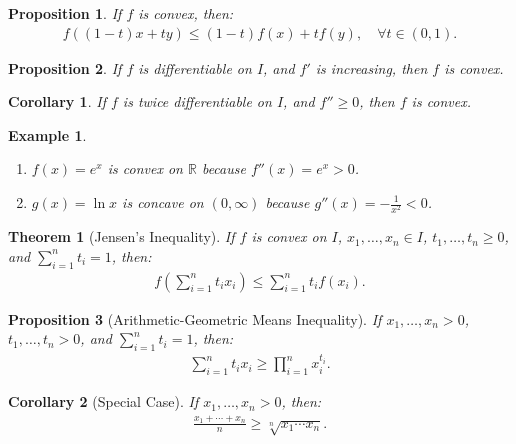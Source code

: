 \documentclass[7pt]{article}
\theoremstyle{definition}
\theoremstyle{plain}
\newtheorem{theorem}{Theorem}
\newtheorem{proposition}{Proposition}
\newtheorem{example}{Example}
\newtheorem{corollary}{Corollary}
\begin{document}
\begin{proposition}
If $ f $ is convex, then:
\begin{align}
f((1-t)x + ty) \leq (1-t)f(x) + tf(y), \quad \forall t \in (0, 1).
\end{align}
\end{proposition}

\begin{proposition}
If $ f $ is differentiable on $ I $, and $ f' $ is increasing, then $ f $ is convex.
\end{proposition}

\begin{corollary}
If $ f $ is twice differentiable on $ I $, and $ f'' \geq 0 $, then $ f $ is convex.
\end{corollary}

\begin{example}
\begin{enumerate}
    \item $ f(x) = e^x $ is convex on $ \mathbb{R} $ because $ f''(x) = e^x > 0 $.
    \item $ g(x) = \ln x $ is concave on $ (0, \infty) $ because $ g''(x) = -\frac{1}{x^2} < 0 $.
\end{enumerate}
\end{example}

\begin{theorem}[Jensen’s Inequality]
If $ f $ is convex on $ I $, $ x_1, \ldots, x_n \in I $, $ t_1, \ldots, t_n \geq 0 $, and $ \sum_{i=1}^n t_i = 1 $, then:
\begin{align}
f\left(\sum_{i=1}^n t_i x_i\right) \leq \sum_{i=1}^n t_i f(x_i).
\end{align}
\end{theorem}

\begin{proposition}[Arithmetic-Geometric Means Inequality]
If $ x_1, \ldots, x_n > 0 $, $ t_1, \ldots, t_n > 0 $, and $ \sum_{i=1}^n t_i = 1 $, then:
\begin{align}
\sum_{i=1}^n t_i x_i \geq \prod_{i=1}^n x_i^{t_i}.
\end{align}
\end{proposition}

\begin{corollary}[Special Case]
If $ x_1, \ldots, x_n > 0 $, then:
\begin{align}
\frac{x_1 + \cdots + x_n}{n} \geq \sqrt[n]{x_1 \cdots x_n}.
\end{align}
\end{corollary}
\end{document}
